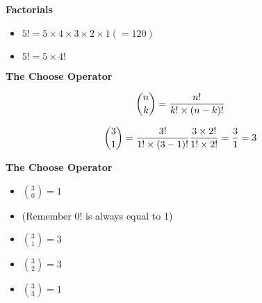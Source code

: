 \documentclass[IntroMain.tex]{subfiles}
\begin{document}
\begin{frame}

\textbf{Factorials}


\begin{itemize}
\item $5! = 5 \times 4 \times 3\times 2 \times 1 (= 120)$
\item $5! = 5 \times 4!$
\end{itemize}


\end{frame}
\begin{frame}
\textbf{The Choose Operator}


\[{n\choose k}  = { n! \over k! \times(n-k)!} \]

\[{3\choose 1}  = { 3! \over 1! \times(3-1)!} { 3 \times 2! \over 1! \times 2!} = \frac{3}{1} = 3 \]


\end{frame}
\begin{frame}
	\textbf{The Choose Operator}

\begin{itemize}
\item ${3 \choose 0} = 1$
\item (Remember $0!$  is always equal to 1)
\item ${3 \choose 1} = 3$
\item ${3 \choose 2} = 3$
\item ${3 \choose 3} = 1$
\end{itemize}
\end{frame}
\end{document}
